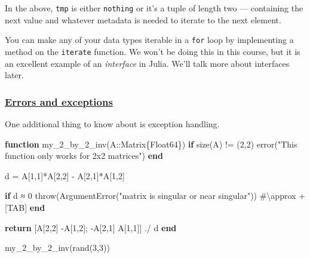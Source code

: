 \documentclass[
]{article}
\newenvironment{Shaded}{\begin{snugshade}}{\end{snugshade}}
\newcommand{\CommentTok}[1]{\textcolor[rgb]{0.37,0.37,0.37}{#1}}
\newcommand{\ControlFlowTok}[1]{\textcolor[rgb]{0.00,0.23,0.31}{\textbf{#1}}}
\newcommand{\DataTypeTok}[1]{\textcolor[rgb]{0.68,0.00,0.00}{#1}}
\newcommand{\FloatTok}[1]{\textcolor[rgb]{0.68,0.00,0.00}{#1}}
\newcommand{\FunctionTok}[1]{\textcolor[rgb]{0.28,0.35,0.67}{#1}}
\newcommand{\KeywordTok}[1]{\textcolor[rgb]{0.00,0.23,0.31}{\textbf{#1}}}
\newcommand{\NormalTok}[1]{\textcolor[rgb]{0.00,0.23,0.31}{#1}}
\newcommand{\OperatorTok}[1]{\textcolor[rgb]{0.37,0.37,0.37}{#1}}
\newcommand{\StringTok}[1]{\textcolor[rgb]{0.13,0.47,0.30}{#1}}
\begin{document}
In the above, \texttt{tmp} is either \texttt{nothing} or it's a tuple of
length two --- containing the next value and whatever metadata is needed
to iterate to the next element.

You can make any of your data types iterable in a \texttt{for} loop by
implementing a method on the \texttt{iterate} function. We won't be
doing this in this course, but it is an excellent example of an
\emph{interface} in Julia. We'll talk more about interfaces later.

\subsubsection{\texorpdfstring{\href{https://docs.julialang.org/en/v1/manual/control-flow/\#Exception-Handling}{Errors
and exceptions}}{Errors and exceptions}}\label{errors-and-exceptions}

One additional thing to know about is exception handling.

\begin{Shaded}
\begin{Highlighting}[]
\KeywordTok{function} \FunctionTok{my\_2\_by\_2\_inv}\NormalTok{(A}\OperatorTok{::}\DataTypeTok{Matrix\{Float64\}}\NormalTok{)}
   \ControlFlowTok{if} \FunctionTok{size}\NormalTok{(A) }\OperatorTok{!=}\NormalTok{ (}\FloatTok{2}\NormalTok{,}\FloatTok{2}\NormalTok{)}
   \FunctionTok{error}\NormalTok{(}\StringTok{"This function only works for 2x2 matrices"}\NormalTok{)}
   \ControlFlowTok{end}

\NormalTok{   d }\OperatorTok{=}\NormalTok{ A[}\FloatTok{1}\NormalTok{,}\FloatTok{1}\NormalTok{]}\OperatorTok{*}\NormalTok{A[}\FloatTok{2}\NormalTok{,}\FloatTok{2}\NormalTok{] }\OperatorTok{{-}}\NormalTok{ A[}\FloatTok{2}\NormalTok{,}\FloatTok{1}\NormalTok{]}\OperatorTok{*}\NormalTok{A[}\FloatTok{1}\NormalTok{,}\FloatTok{2}\NormalTok{]}

   \ControlFlowTok{if}\NormalTok{ d }\OperatorTok{≈} \FloatTok{0}
   \FunctionTok{throw}\NormalTok{(}\FunctionTok{ArgumentError}\NormalTok{(}\StringTok{"matrix is singular or near singular"}\NormalTok{)) }\CommentTok{\#\textbackslash{}approx + [TAB]}
   \ControlFlowTok{end}

   \ControlFlowTok{return}\NormalTok{ [A[}\FloatTok{2}\NormalTok{,}\FloatTok{2}\NormalTok{] }\OperatorTok{{-}}\NormalTok{A[}\FloatTok{1}\NormalTok{,}\FloatTok{2}\NormalTok{]; }\OperatorTok{{-}}\NormalTok{A[}\FloatTok{2}\NormalTok{,}\FloatTok{1}\NormalTok{] A[}\FloatTok{1}\NormalTok{,}\FloatTok{1}\NormalTok{]] }\OperatorTok{./}\NormalTok{ d}
\KeywordTok{end}

\FunctionTok{my\_2\_by\_2\_inv}\NormalTok{(}\FunctionTok{rand}\NormalTok{(}\FloatTok{3}\NormalTok{,}\FloatTok{3}\NormalTok{))}
\end{Highlighting}
\end{Shaded}
\end{document}
